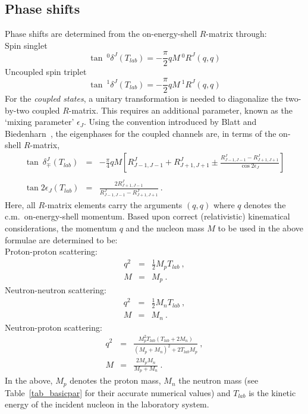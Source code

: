 \subsection{Phase shifts}
Phase shifts are determined from the on-energy-shell $R$-matrix 
through:
\\
{ Spin singlet}
\begin{equation}
\tan\: ^0\delta^J(T_{lab}) = -\frac{\pi}{2} q M\: ^0{R}^J(q,q)
\label{23.1}
\end{equation}
{ Uncoupled spin triplet}
\begin{equation}
\tan\: ^1\delta^J(T_{lab}) = -\frac{\pi}{2} q M\: ^1{R}^J(q,q)
\label{23.2}
\end{equation}
For the {\it coupled states}, a unitary transformation is needed to diagonalize 
the two-by-two coupled $R$-matrix. This requires an additional parameter,
known as the `mixing 
parameter' $\epsilon_J$. Using the convention introduced by Blatt and 
Biedenharn~\cite{BB52}, the eigenphases for the coupled channels are,
in terms of the on-shell ${R}$-matrix,
\begin{eqnarray}
\tan\: \delta^J_{\mp}(T_{lab})& =& -\frac{\pi}{4} q M
\left[ {R}^J_{J-1,J-1} + {R}^J_{J+1,J+1} \pm
\frac{{R}^J_{J-1,J-1} - {R}^J_{J+1,J+1}}{\cos 2\epsilon_J}\right]
\nonumber \\
\label{23.3}  \\
\tan 2\epsilon_J(T_{lab}) & = & \frac{2{R}^J_{J+1,J-1}}
{{R}^J_{J-1,J-1} - {R}^J_{J+1,J+1}}\: . \nonumber
\end{eqnarray}
Here, all ${R}$-matrix elements carry the arguments
 $(q,q)$ where $q$ denotes the c.m.\ on-energy-shell momentum.
Based upon correct (relativistic) kinematical considerations,
the momentum $q$ and the nucleon mass $M$ to be used in the
above formulae are determined to be:
\\
Proton-proton scattering:
\begin{eqnarray}
q^2 & = & \frac12 M_p T_{lab} \: ,\\
M & = & M_p
\: .
\end{eqnarray}
Neutron-neutron scattering:
\begin{eqnarray}
q^2 & = & \frac12 M_n T_{lab} \: ,\\
M & = & M_n
\: .
\end{eqnarray}
Neutron-proton scattering:
\begin{eqnarray}
q^2 & = & \frac{M_p^2 T_{lab} (T_{lab} + 2M_n)}
               {(M_p + M_n)^2 + 2T_{lab} M_p} \: , 
\label{eq_relkin}
\\
M & = & \frac{2M_pM_n}{M_p+M_n}
\: .
\end{eqnarray}
In the above, $M_p$ denotes the proton mass, $M_n$ the
neutron mass (see Table~\ref{tab_basicpar} for their accurate
numerical values) and $T_{lab}$ is the kinetic energy of
the incident nucleon in the laboratory system.

